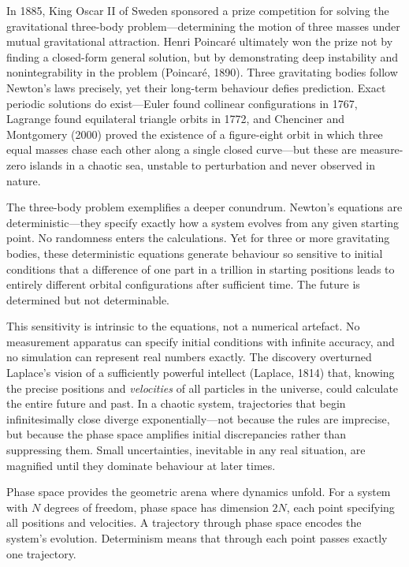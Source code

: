 In 1885, King Oscar II of Sweden sponsored a prize competition for solving the gravitational three-body problem—determining the motion of three masses under mutual gravitational attraction. Henri Poincaré ultimately won the prize not by finding a closed-form general solution, but by demonstrating deep instability and nonintegrability in the problem (Poincaré, 1890). Three gravitating bodies follow Newton's laws precisely, yet their long-term behaviour defies prediction. Exact periodic solutions do exist—Euler found collinear configurations in 1767, Lagrange found equilateral triangle orbits in 1772, and Chenciner and Montgomery (2000) proved the existence of a figure-eight orbit in which three equal masses chase each other along a single closed curve—but these are measure-zero islands in a chaotic sea, unstable to perturbation and never observed in nature.

The three-body problem exemplifies a deeper conundrum. Newton’s equations are deterministic—they specify exactly how a system evolves from any given starting point. No randomness enters the calculations. Yet for three or more gravitating bodies, these deterministic equations generate behaviour so sensitive to initial conditions that a difference of one part in a trillion in starting positions leads to entirely different orbital configurations after sufficient time. The future is determined but not determinable.

This sensitivity is intrinsic to the equations, not a numerical artefact. No measurement apparatus can specify initial conditions with infinite accuracy, and no simulation can represent real numbers exactly. The discovery overturned Laplace’s vision of a sufficiently powerful intellect (Laplace, 1814) that, knowing the precise positions and \textit{velocities} of all particles in the universe, could calculate the entire future and past. In a chaotic system, trajectories that begin infinitesimally close diverge exponentially—not because the rules are imprecise, but because the phase space amplifies initial discrepancies rather than suppressing them. Small uncertainties, inevitable in any real situation, are magnified until they dominate behaviour at later times.

Phase space provides the geometric arena where dynamics unfold. For a system with $N$ degrees of freedom, phase space has dimension $2N$, each point specifying all positions and velocities. A trajectory through phase space encodes the system's evolution. Determinism means that through each point passes exactly one trajectory.

